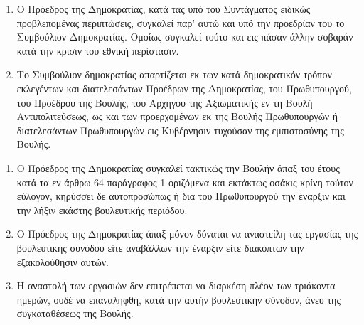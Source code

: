 \documentclass[twoside, a4paper, 10pt]{article}
\begin{document}
\begin{multicols}{2}
\begin{enumerate}
\begin{BigQuote}
\begin{enumerate}
  \item[1.] Ο Πρόεδρος της Δημοκρατίας, κατά τας υπό του Συντάγματος ειδικώς προβλεπομένας περιπτώσεις, συγκαλεί παρ' αυτώ και υπό την προεδρίαν του το Συμβούλιον Δημοκρατίας. Ομοίως συγκαλεί τούτο και εις πάσαν άλλην σοβαράν κατά την κρίσιν του εθνική περίστασιν.
  \item[2.] Το Συμβούλιον δημοκρατίας απαρτίζεται εκ των κατά δημοκρατικόν τρόπον εκλεγέντων και διατελεσάντων Προέδρων της Δημοκρατίας, του Πρωθυπουργού, του Προέδρου της Βουλής, του Αρχηγού της Αξιωματικής εν τη Βουλή Αντιπολιτεύσεως, ως και των προερχομένων εκ της Βουλής Πρωθυπουργών ή διατελεσάντων Πρωθυπουργών εις Κυβέρνησιν τυχούσαν της εμπιστοσύνης της Βουλής.
\end{enumerate}

\begin{enumerate}
  \item[1.] Ο Πρόεδρος της Δημοκρατίας συγκαλεί τακτικώς την Βουλήν άπαξ του έτους κατά τα εν άρθρω 64 παράγραφος 1 οριζόμενα και εκτάκτως οσάκις κρίνη τούτον εύλογον, κηρύσσει δε αυτοπροσώπως ή δια του Πρωθυπουργού την έναρξιν και την λήξιν εκάστης βουλευτικής περιόδου.
  \item[2.] Ο Πρόεδρος της Δημοκρατίας άπαξ μόνον δύναται να αναστείλη τας εργασίας της βουλευτικής συνόδου είτε αναβάλλων την έναρξιν είτε διακόπτων την εξακολούθησιν αυτών.
  \item[3.] Η αναστολή των εργασιών δεν επιτρέπεται να διαρκέση πλέον των τριάκοντα ημερών, ουδέ να επαναληφθή, κατά την αυτήν βουλευτικήν σύνοδον, άνευ της συγκαταθέσεως της Βουλής.
\end{enumerate}


\end{BigQuote}
\end{enumerate}
\end{multicols}
\end{document}
